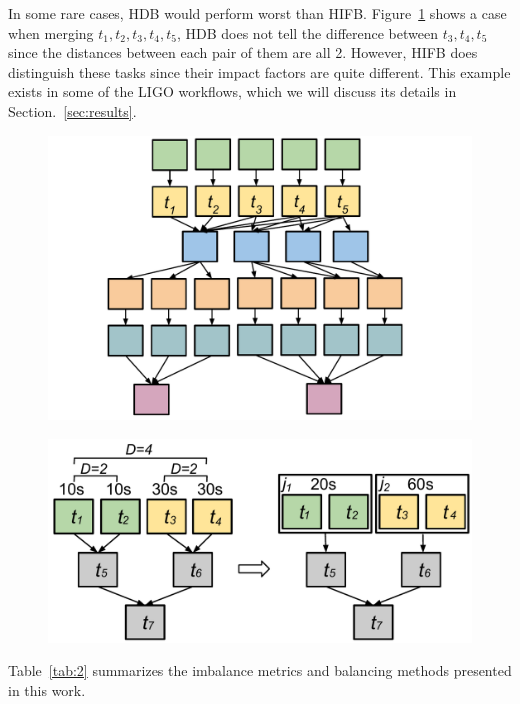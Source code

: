 In some rare cases, HDB would perform worst than HIFB. Figure~\ref{fig:imbalance_hifb_hdb} shows a case when merging $t_1, t_2, t_3, t_4, t_5$, HDB does not tell the difference between $t_3, t_4, t_5$ since the distances between each pair of them are all 2. However, HIFB does distinguish these tasks since their impact factors are quite different. This example exists in some of the LIGO workflows, which we will discuss its details in Section.~\ref{sec:results}. 

\begin{figure}[htb]
	\centering
	\includegraphics[width=1.0\linewidth]{figures/imbalance/hifb_vs_hdb.pdf}
	\label{fig:imbalance_hifb_hdb}
\end{figure}

\begin{figure}[htb]
	\centering
	\includegraphics[width=0.85\linewidth]{figures/imbalance/hdb.pdf}
	\label{fig:imbalance_hdb}
\end{figure}

Table~\ref{tab:2} summarizes the imbalance metrics and balancing methods presented in this work. 

